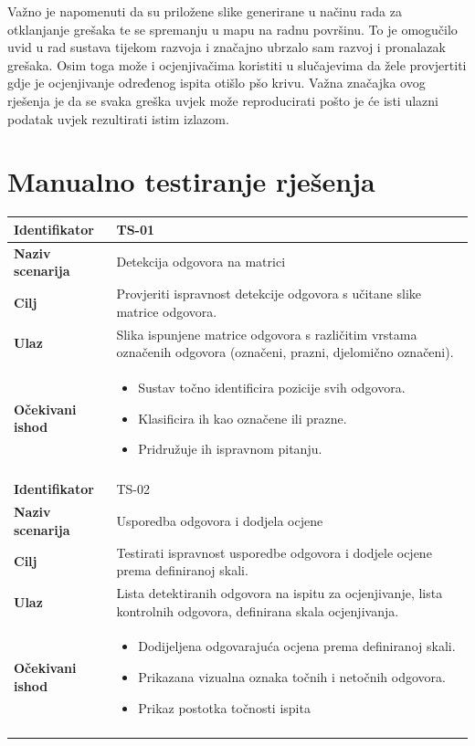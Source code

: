 \documentclass{foi}
\begin{document}
Važno je napomenuti da su priložene slike generirane u načinu rada za otklanjanje grešaka te se spremanju u mapu na radnu površinu. To je omogučilo uvid u rad sustava tijekom razvoja i značajno ubrzalo sam razvoj i pronalazak grešaka. Osim toga može i ocjenjivačima koristiti u slučajevima da žele provjertiti gdje je ocjenjivanje određenog ispita otišlo pšo krivu. Važna značajka ovog rješenja je da se svaka greška uvjek može reproducirati pošto je će isti ulazni podatak uvjek rezultirati istim izlazom.

\section{Manualno testiranje rješenja}

\begin{table}[H]
\centering
\begin{tabular}{|l|p{11cm}|}
\hline
\textbf{Identifikator} & TS-01 \\ \hline
\textbf{Naziv scenarija} & Detekcija odgovora na matrici \\ \hline
\textbf{Cilj} & Provjeriti ispravnost detekcije odgovora s učitane slike matrice odgovora. \\ \hline
\textbf{Ulaz} & Slika ispunjene matrice odgovora s različitim vrstama označenih odgovora (označeni, prazni, djelomično označeni). \\ \hline
\textbf{Očekivani ishod} & 
\begin{itemize}
    \item Sustav točno identificira pozicije svih odgovora.
    \item Klasificira ih kao označene ili prazne.
    \item Pridružuje ih ispravnom pitanju.
\end{itemize} \\ \hline
\multicolumn{2}{|c|}{} \\ \hline

\textbf{Identifikator} & TS-02 \\ \hline
\textbf{Naziv scenarija} & Usporedba odgovora i dodjela ocjene \\ \hline
\textbf{Cilj} & Testirati ispravnost usporedbe odgovora i dodjele ocjene prema definiranoj skali. \\ \hline
\textbf{Ulaz} & Lista detektiranih odgovora na ispitu za ocjenjivanje, lista kontrolnih odgovora, definirana skala ocjenjivanja. \\ \hline
\textbf{Očekivani ishod} & 
\begin{itemize}
    \item Dodijeljena odgovarajuća ocjena prema definiranoj skali.
    \item Prikazana vizualna oznaka točnih i netočnih odgovora.
    \item Prikaz postotka točnosti ispita
\end{itemize} \\ \hline
\multicolumn{2}{|c|}{} \\ \hline


\end{tabular}
\end{table}
\end{document}
